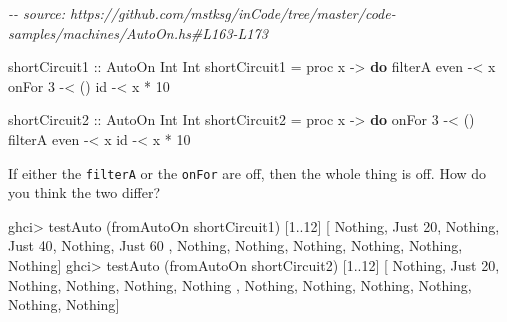 \documentclass[]{article}
\newenvironment{Shaded}{}{}
\newcommand{\CommentTok}[1]{\textcolor[rgb]{0.38,0.63,0.69}{\textit{#1}}}
\newcommand{\DataTypeTok}[1]{\textcolor[rgb]{0.56,0.13,0.00}{#1}}
\newcommand{\DecValTok}[1]{\textcolor[rgb]{0.25,0.63,0.44}{#1}}
\newcommand{\FunctionTok}[1]{\textcolor[rgb]{0.02,0.16,0.49}{#1}}
\newcommand{\KeywordTok}[1]{\textcolor[rgb]{0.00,0.44,0.13}{\textbf{#1}}}
\newcommand{\NormalTok}[1]{#1}
\newcommand{\OperatorTok}[1]{\textcolor[rgb]{0.40,0.40,0.40}{#1}}
\newcommand{\OtherTok}[1]{\textcolor[rgb]{0.00,0.44,0.13}{#1}}
\begin{document}
\begin{Shaded}
\begin{Highlighting}[]
\CommentTok{{-}{-} source: https://github.com/mstksg/inCode/tree/master/code{-}samples/machines/AutoOn.hs\#L163{-}L173}

\OtherTok{shortCircuit1 ::} \DataTypeTok{AutoOn} \DataTypeTok{Int} \DataTypeTok{Int}
\NormalTok{shortCircuit1 }\OtherTok{=}\NormalTok{ proc x }\OtherTok{{-}>} \KeywordTok{do}
\NormalTok{    filterA }\FunctionTok{even} \OperatorTok{{-}<}\NormalTok{ x}
\NormalTok{    onFor }\DecValTok{3}      \OperatorTok{{-}<}\NormalTok{ ()}
    \FunctionTok{id}           \OperatorTok{{-}<}\NormalTok{ x }\OperatorTok{*} \DecValTok{10}

\OtherTok{shortCircuit2 ::} \DataTypeTok{AutoOn} \DataTypeTok{Int} \DataTypeTok{Int}
\NormalTok{shortCircuit2 }\OtherTok{=}\NormalTok{ proc x }\OtherTok{{-}>} \KeywordTok{do}
\NormalTok{    onFor }\DecValTok{3}      \OperatorTok{{-}<}\NormalTok{ ()}
\NormalTok{    filterA }\FunctionTok{even} \OperatorTok{{-}<}\NormalTok{ x}
    \FunctionTok{id}           \OperatorTok{{-}<}\NormalTok{ x }\OperatorTok{*} \DecValTok{10}
\end{Highlighting}
\end{Shaded}

If either the \texttt{filterA} or the \texttt{onFor} are off, then the whole
thing is off. How do you think the two differ?

\begin{Shaded}
\begin{Highlighting}[]
\NormalTok{ghci}\OperatorTok{>}\NormalTok{ testAuto (fromAutoOn shortCircuit1) [}\DecValTok{1}\OperatorTok{..}\DecValTok{12}\NormalTok{]}
\NormalTok{[ }\DataTypeTok{Nothing}\NormalTok{, }\DataTypeTok{Just} \DecValTok{20}\NormalTok{, }\DataTypeTok{Nothing}\NormalTok{, }\DataTypeTok{Just} \DecValTok{40}\NormalTok{, }\DataTypeTok{Nothing}\NormalTok{, }\DataTypeTok{Just} \DecValTok{60}
\NormalTok{, }\DataTypeTok{Nothing}\NormalTok{, }\DataTypeTok{Nothing}\NormalTok{, }\DataTypeTok{Nothing}\NormalTok{, }\DataTypeTok{Nothing}\NormalTok{, }\DataTypeTok{Nothing}\NormalTok{, }\DataTypeTok{Nothing}\NormalTok{]}
\NormalTok{ghci}\OperatorTok{>}\NormalTok{ testAuto (fromAutoOn shortCircuit2) [}\DecValTok{1}\OperatorTok{..}\DecValTok{12}\NormalTok{]}
\NormalTok{[ }\DataTypeTok{Nothing}\NormalTok{, }\DataTypeTok{Just} \DecValTok{20}\NormalTok{, }\DataTypeTok{Nothing}\NormalTok{, }\DataTypeTok{Nothing}\NormalTok{, }\DataTypeTok{Nothing}\NormalTok{, }\DataTypeTok{Nothing}
\NormalTok{, }\DataTypeTok{Nothing}\NormalTok{, }\DataTypeTok{Nothing}\NormalTok{, }\DataTypeTok{Nothing}\NormalTok{, }\DataTypeTok{Nothing}\NormalTok{, }\DataTypeTok{Nothing}\NormalTok{, }\DataTypeTok{Nothing}\NormalTok{]}
\end{Highlighting}
\end{Shaded}
\end{document}
